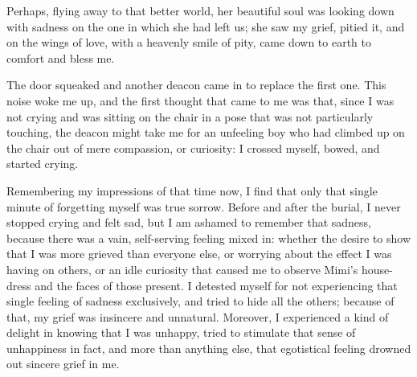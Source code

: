 Perhaps, flying away to that better world, her beautiful soul was looking down with sadness on the one in which she had left us; she saw my grief, pitied it, and on the wings of love, with a heavenly smile of pity, came down to earth to comfort and bless me.

The door squeaked and another deacon came in to replace the first one. This noise woke me up, and the first thought that came to me was that, since I was not crying and was sitting on the chair in a pose that was not particularly touching, the deacon might take me for an unfeeling boy who had climbed up on the chair out of mere compassion, or curiosity: I crossed myself, bowed, and started crying.

Remembering my impressions of that time now, I find that only that single minute of forgetting myself was true sorrow. Before and after the burial, I never stopped crying and felt sad, but I am ashamed to remember that sadness, because there was a vain, self-serving feeling mixed in: whether the desire to show that I was more grieved than everyone else, or worrying about the effect I was having on others, or an idle curiosity that caused me to observe Mimi's house-dress and the faces of those present. I detested myself for not experiencing that single feeling of sadness exclusively, and tried to hide all the others; because of that, my grief was insincere and unnatural. Moreover, I experienced a kind of delight in knowing that I was unhappy, tried to stimulate that sense of unhappiness in fact, and more than anything else, that egotistical feeling drowned out sincere grief in me.

